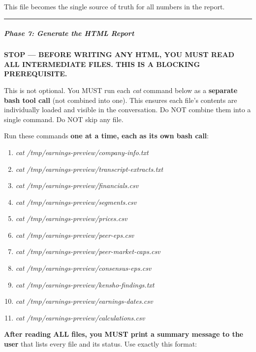 \documentclass[11pt]{article}
\begin{document}
This file becomes the single source of truth for all numbers in the report.


\vspace{0.5em}\hrule\vspace{0.5em}

\subparagraph{Phase 7: Generate the HTML Report}\mbox{}\par

\textbf{STOP — BEFORE WRITING ANY HTML, YOU MUST READ ALL INTERMEDIATE FILES. THIS IS A BLOCKING PREREQUISITE.}


This is not optional. You MUST run each \emph{cat} command below as a \textbf{separate bash tool call} (not combined into one). This ensures each file's contents are individually loaded and visible in the conversation. Do NOT combine them into a single command. Do NOT skip any file.


Run these commands \textbf{one at a time, each as its own bash call}:


\begin{enumerate}[leftmargin=*,itemsep=2pt,topsep=2pt]
\item {} \emph{cat /tmp/earnings-preview/company-info.txt}
\item {} \emph{cat /tmp/earnings-preview/transcript-extracts.txt}
\item {} \emph{cat /tmp/earnings-preview/financials.csv}
\item {} \emph{cat /tmp/earnings-preview/segments.csv}
\item {} \emph{cat /tmp/earnings-preview/prices.csv}
\item {} \emph{cat /tmp/earnings-preview/peer-eps.csv}
\item {} \emph{cat /tmp/earnings-preview/peer-market-caps.csv}
\item {} \emph{cat /tmp/earnings-preview/consensus-eps.csv}
\item {} \emph{cat /tmp/earnings-preview/kensho-findings.txt}
\item {} \emph{cat /tmp/earnings-preview/earnings-dates.csv}
\item {} \emph{cat /tmp/earnings-preview/calculations.csv}
\end{enumerate}

\textbf{After reading ALL files, you MUST print a summary message to the user} that lists every file and its status. Use exactly this format:
\end{document}
